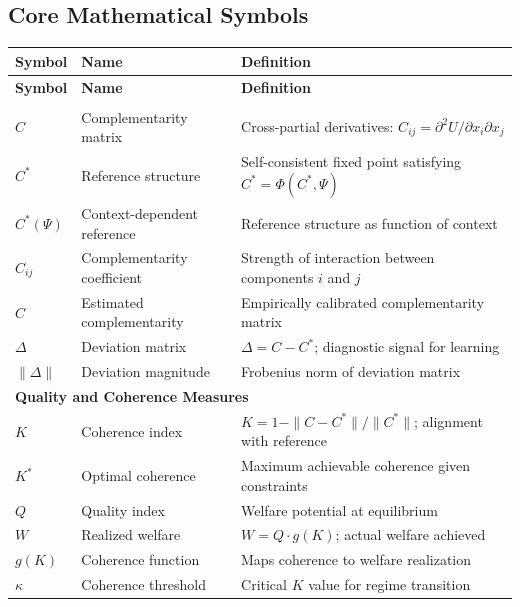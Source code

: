 \subsection{Core Mathematical Symbols}
\label{sec:glossary-symbols}

\begin{center}
\renewcommand{\arraystretch}{1.3}
\begin{longtable}{lp{4cm}p{7cm}}
\hline
\textbf{Symbol} & \textbf{Name} & \textbf{Definition} \\
\hline
\endfirsthead
\hline
\textbf{Symbol} & \textbf{Name} & \textbf{Definition} \\
\hline
\endhead
\hline
\endfoot

\multicolumn{3}{l}{\textbf{Complementarity Structure}} \\
\hline
$C$ & Complementarity matrix & Cross-partial derivatives: $C_{ij} = \partial^2 U / \partial x_i \partial x_j$ \\
$C^*$ & Reference structure & Self-consistent fixed point satisfying $C^* = \Phi(C^*, \Psi)$ \\
$C^*(\Psi)$ & Context-dependent reference & Reference structure as function of context \\
$C_{ij}$ & Complementarity coefficient & Strength of interaction between components $i$ and $j$ \\
$\hat{C}$ & Estimated complementarity & Empirically calibrated complementarity matrix \\
$\Delta$ & Deviation matrix & $\Delta = C - C^*$; diagnostic signal for learning \\
$\|\Delta\|$ & Deviation magnitude & Frobenius norm of deviation matrix \\
\hline

\multicolumn{3}{l}{\textbf{Quality and Coherence Measures}} \\
\hline
$K$ & Coherence index & $K = 1 - \|C - C^*\|/\|C^*\|$; alignment with reference \\
$K^*$ & Optimal coherence & Maximum achievable coherence given constraints \\
$Q$ & Quality index & Welfare potential at equilibrium \\
$W$ & Realized welfare & $W = Q \cdot g(K)$; actual welfare achieved \\
$g(K)$ & Coherence function & Maps coherence to welfare realization \\
$\kappa$ & Coherence threshold & Critical $K$ value for regime transition \\
\hline


\end{longtable}
\end{center}
